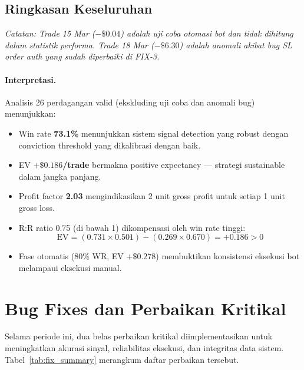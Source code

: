 \documentclass[10pt,a4paper]{article}
\begin{document}
\subsection{Ringkasan Keseluruhan}
\label{subsec:summary}

\noindent\textit{Catatan: Trade 15 Mar ($-\$0.04$) adalah uji coba otomasi bot dan tidak dihitung
dalam statistik performa. Trade 18 Mar ($-\$6.30$) adalah anomali akibat bug SL order auth
yang sudah diperbaiki di FIX-3.}

\paragraph{Interpretasi.}
Analisis 26 perdagangan valid (ekskluding uji coba dan anomali bug) menunjukkan:
\begin{itemize}
    \item Win rate \textbf{73.1\%} menunjukkan sistem signal detection yang robust
          dengan conviction threshold yang dikalibrasi dengan baik.
    \item EV \textbf{$+\$0.186$/trade} bermakna positive expectancy — strategi
          sustainable dalam jangka panjang.
    \item Profit factor \textbf{2.03} mengindikasikan 2 unit gross profit untuk
          setiap 1 unit gross loss.
    \item R:R ratio 0.75 (di bawah 1) dikompensasi oleh win rate tinggi:
          \[ \text{EV} = (0.731 \times 0.501) - (0.269 \times 0.670) = +0.186 > 0 \]
    \item Fase otomatis (80\% WR, EV $+\$0.278$) membuktikan konsistensi eksekusi
          bot melampaui eksekusi manual.
\end{itemize}

\newpage
\section{Bug Fixes dan Perbaikan Kritikal}
\label{sec:bugfixes}

Selama periode ini, dua belas perbaikan kritikal diimplementasikan untuk meningkatkan akurasi sinyal, reliabilitas eksekusi, dan integritas data sistem. Tabel~\ref{tab:fix_summary} merangkum daftar perbaikan tersebut.
\end{document}
